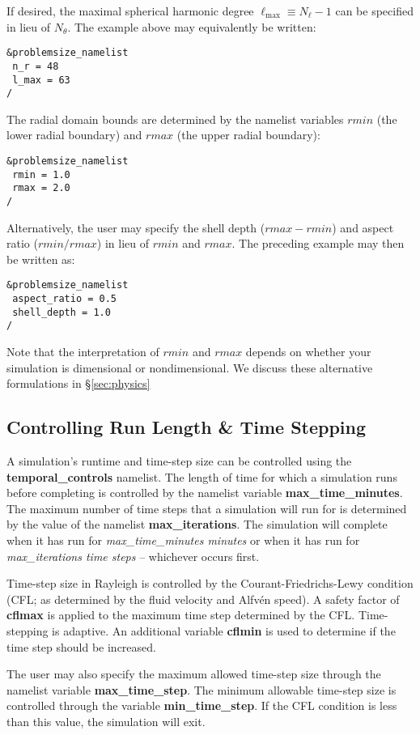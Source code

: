 If desired, the maximal spherical harmonic degree $\ell_\mathrm{max}\equiv N_\ell-1$ can be specified in lieu of $N_\theta$.  The example above may equivalently be written:
\begin{lstlisting}
&problemsize_namelist
 n_r = 48
 l_max = 63
/
\end{lstlisting}

The radial domain bounds are determined by the namelist variables $rmin$ (the lower radial boundary) and $rmax$ (the upper radial boundary):
\begin{lstlisting}
&problemsize_namelist
 rmin = 1.0
 rmax = 2.0
/
\end{lstlisting}

Alternatively, the user may specify the shell depth ($rmax-rmin$) and aspect ratio ($rmin/rmax$) in lieu of $rmin$ and $rmax$.  The preceding example may then be written as:
\begin{lstlisting}
&problemsize_namelist
 aspect_ratio = 0.5
 shell_depth = 1.0
/
\end{lstlisting}

Note that the interpretation of $rmin$ and $rmax$ depends on whether your simulation is dimensional or nondimensional.  We discuss these alternative formulations in \S \ref{sec:physics}


\subsection{Controlling Run Length \& Time Stepping}

A simulation's runtime and time-step size can be controlled using the \textbf{temporal\_controls} namelist.  The length of time for which a simulation runs before completing is controlled by the namelist variable \textbf{max\_time\_minutes}.  The maximum number of time steps that a simulation will run for is determined by the value of the namelist \textbf{max\_iterations}.  The simulation will complete when it has run for \textit{max\_time\_minutes minutes} or when it has run for \textit{max\_iterations time steps} -- whichever occurs first.

Time-step size in Rayleigh is controlled by the Courant-Friedrichs-Lewy condition (CFL; as determined by the fluid velocity and Alfv\'{e}n speed).  A safety factor of \textbf{cflmax} is applied to the maximum time step determined by the CFL.  Time-stepping is adaptive.  An additional variable \textbf{cflmin} is used to determine if the time step should be increased.

The user may also specify the maximum allowed time-step size through the namelist variable \textbf{max\_time\_step}.  The minimum allowable time-step size is controlled through the variable \textbf{min\_time\_step}.  If the CFL condition is less than this value, the simulation will exit.

